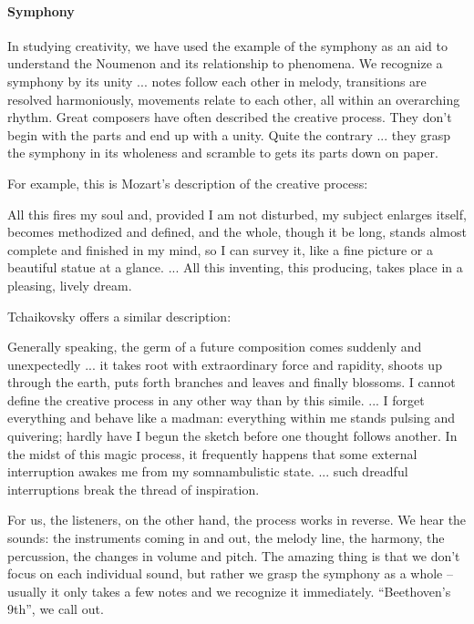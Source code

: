 \paragraph{Symphony}


In studying creativity, we have used the example of the symphony as an aid to understand the Noumenon and its relationship to phenomena. We recognize a symphony by its unity ... notes follow each other in melody, transitions are resolved harmoniously, movements relate to each other, all within an overarching rhythm. Great composers have often described the creative process. They don't begin with the parts and end up with a unity. Quite the contrary ... they grasp the symphony in its wholeness and scramble to gets its parts down on paper.

For example, this is Mozart's description of the creative process:

\begin{quotex}
All this fires my soul and, provided I am not disturbed, my subject enlarges itself, becomes methodized and defined, and the whole, though it be long, stands almost complete and finished in my mind, so I can survey it, like a fine picture or a beautiful statue at a glance.
... All this inventing, this producing, takes place in a pleasing, lively dream.
\end{quotex}


Tchaikovsky offers a similar description:

\begin{quotex}
Generally speaking, the germ of a future composition comes suddenly and unexpectedly ... it takes root with extraordinary force and rapidity, shoots up through the earth, puts forth branches and leaves and finally blossoms. I cannot define the creative process in any other way than by this simile. ... I forget everything and behave like a madman: everything within me stands pulsing and quivering; hardly have I begun the sketch before one thought follows another. In the midst of this magic process, it frequently happens that some external interruption awakes me from my somnambulistic state. ... such dreadful interruptions break the thread of inspiration.
\end{quotex}


For us, the listeners, on the other hand, the process works in reverse. We hear the sounds: the instruments coming in and out, the melody line, the harmony, the percussion, the changes in volume and pitch. The amazing thing is that we don't focus on each individual sound, but rather we grasp the symphony as a whole -- usually it only takes a few notes and we recognize it immediately. ``Beethoven's 9th'', we call out.

